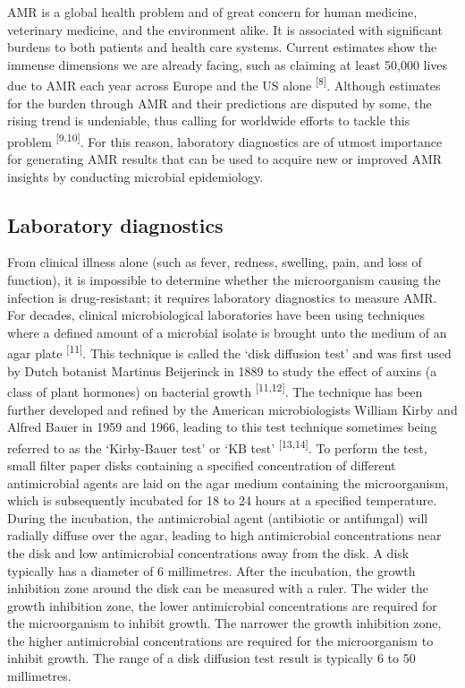 \documentclass[
]{book}
\begin{document}
AMR is a global health problem and of great concern for human medicine, veterinary medicine, and the environment alike. It is associated with significant burdens to both patients and health care systems. Current estimates show the immense dimensions we are already facing, such as claiming at least 50,000 lives due to AMR each year across Europe and the US alone \textsuperscript{{[}8{]}}. Although estimates for the burden through AMR and their predictions are disputed by some, the rising trend is undeniable, thus calling for worldwide efforts to tackle this problem \textsuperscript{{[}9,10{]}}. For this reason, laboratory diagnostics are of utmost importance for generating AMR results that can be used to acquire new or improved AMR insights by conducting microbial epidemiology.

\hypertarget{laboratory-diagnostics}{%
\subsection{Laboratory diagnostics}\label{laboratory-diagnostics}}

From clinical illness alone (such as fever, redness, swelling, pain, and loss of function), it is impossible to determine whether the microorganism causing the infection is drug-resistant; it requires laboratory diagnostics to measure AMR. For decades, clinical microbiological laboratories have been using techniques where a defined amount of a microbial isolate is brought unto the medium of an agar plate \textsuperscript{{[}11{]}}. This technique is called the `disk diffusion test' and was first used by Dutch botanist Martinus Beijerinck in 1889 to study the effect of auxins (a class of plant hormones) on bacterial growth \textsuperscript{{[}11,12{]}}. The technique has been further developed and refined by the American microbiologists William Kirby and Alfred Bauer in 1959 and 1966, leading to this test technique sometimes being referred to as the `Kirby-Bauer test' or `KB test' \textsuperscript{{[}13,14{]}}. To perform the test, small filter paper disks containing a specified concentration of different antimicrobial agents are laid on the agar medium containing the microorganism, which is subsequently incubated for 18 to 24 hours at a specified temperature. During the incubation, the antimicrobial agent (antibiotic or antifungal) will radially diffuse over the agar, leading to high antimicrobial concentrations near the disk and low antimicrobial concentrations away from the disk. A disk typically has a diameter of 6 millimetres. After the incubation, the growth inhibition zone around the disk can be measured with a ruler. The wider the growth inhibition zone, the lower antimicrobial concentrations are required for the microorganism to inhibit growth. The narrower the growth inhibition zone, the higher antimicrobial concentrations are required for the microorganism to inhibit growth. The range of a disk diffusion test result is typically 6 to 50 millimetres.
\end{document}
